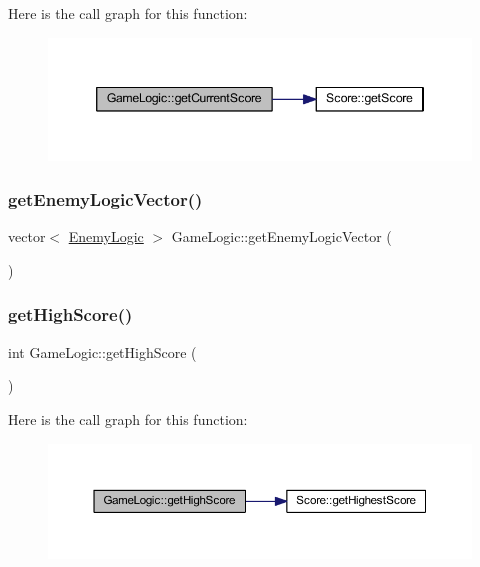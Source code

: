 Here is the call graph for this function\+:
\nopagebreak
\begin{figure}[H]
\begin{center}
\leavevmode
\includegraphics[width=346pt]{class_game_logic_a56e4499d60c8784c3bf34ab91a75e273_cgraph}
\end{center}
\end{figure}
\mbox{\label{class_game_logic_afa1fd0270df0970723f3aef06431e2d8}} 
\subsubsection{\texorpdfstring{get\+Enemy\+Logic\+Vector()}{getEnemyLogicVector()}}
{\footnotesize\ttfamily vector$<$ \hyperlink{class_enemy_logic}{Enemy\+Logic} $>$ Game\+Logic\+::get\+Enemy\+Logic\+Vector (\begin{DoxyParamCaption}{ }\end{DoxyParamCaption})}

\mbox{\label{class_game_logic_a05ad3bbd5acd9f0b41d1f1d29cac8017}} 
\subsubsection{\texorpdfstring{get\+High\+Score()}{getHighScore()}}
{\footnotesize\ttfamily int Game\+Logic\+::get\+High\+Score (\begin{DoxyParamCaption}{ }\end{DoxyParamCaption})}

Here is the call graph for this function\+:
\nopagebreak
\begin{figure}[H]
\begin{center}
\leavevmode
\includegraphics[width=350pt]{class_game_logic_a05ad3bbd5acd9f0b41d1f1d29cac8017_cgraph}
\end{center}
\end{figure}
\mbox{\label{class_game_logic_abe0e031ff3278ebb3c049b06f458e5b4}} 

